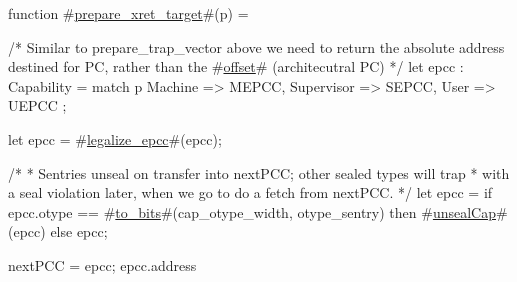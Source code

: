 function #\hyperref[sailRISCVzpreparezyxretzytarget]{prepare\_xret\_target}#(p) = {
  /* Similar to prepare_trap_vector above we need to return the absolute address
     destined for PC, rather than the #\hyperref[sailRISCVzoffset]{offset}# (architecutral PC) */
  let epcc : Capability = match p {
                            Machine    => MEPCC,
                            Supervisor => SEPCC,
                            User       => UEPCC
                          };

  let epcc = #\hyperref[sailRISCVzlegalizzezyepcc]{legalize\_epcc}#(epcc);

  /*
   * Sentries unseal on transfer into nextPCC; other sealed types will trap
   * with a seal violation later, when we go to do a fetch from nextPCC.
   */
  let epcc = if epcc.otype == #\hyperref[sailRISCVztozybits]{to\_bits}#(cap_otype_width, otype_sentry)
             then #\hyperref[sailRISCVzunsealCap]{unsealCap}#(epcc)
             else epcc;

  nextPCC = epcc;
  epcc.address
}
